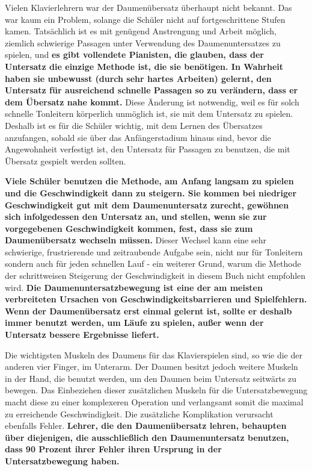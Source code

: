 Vielen Klavierlehrern war der Daumenübersatz überhaupt nicht bekannt.
Das war kaum ein Problem, solange die Schüler nicht auf fortgeschrittene Stufen kamen.
Tatsächlich ist es mit genügend Anstrengung und Arbeit möglich, ziemlich schwierige Passagen unter Verwendung des Daumenuntersatzes zu spielen, und \textbf{es gibt vollendete Pianisten, die glauben, dass der Untersatz die einzige Methode ist, die sie benötigen.
In Wahrheit haben sie unbewusst (durch sehr hartes Arbeiten) gelernt, den Untersatz für ausreichend schnelle Passagen so zu verändern, dass er  dem Übersatz nahe kommt.}
Diese Änderung ist notwendig, weil es für solch schnelle Tonleitern körperlich unmöglich ist, sie mit dem Untersatz zu spielen.
Deshalb ist es für die Schüler wichtig, mit dem Lernen des Übersatzes anzufangen, sobald sie über das Anfängerstadium hinaus sind, bevor die Angewohnheit verfestigt ist, den Untersatz für Passagen zu benutzen, die mit Übersatz gespielt werden sollten.

\textbf{Viele Schüler benutzen die Methode, am Anfang langsam zu spielen und die Geschwindigkeit dann zu steigern.
Sie kommen bei niedriger Geschwindigkeit gut mit dem Daumenuntersatz zurecht, gewöhnen sich infolgedessen den Untersatz an, und stellen, wenn sie zur vorgegebenen Geschwindigkeit kommen, fest, dass sie zum Daumenübersatz wechseln müssen.}
Dieser Wechsel kann eine sehr schwierige, frustrierende und zeitraubende Aufgabe sein, nicht nur für Tonleitern sondern auch für jeden schnellen Lauf - ein weiterer Grund, warum die Methode der schrittweisen Steigerung der Geschwindigkeit in diesem Buch nicht empfohlen wird.
\textbf{Die Daumenuntersatzbewegung ist eine der am meisten verbreiteten Ursachen von Geschwindigkeitsbarrieren und Spielfehlern.
Wenn der Daumenübersatz erst einmal gelernt ist, sollte er deshalb immer benutzt werden, um Läufe zu spielen, außer wenn der Untersatz bessere Ergebnisse liefert.}

Die wichtigsten Muskeln des Daumens für das Klavierspielen sind, so wie die der anderen vier Finger, im Unterarm.
Der Daumen besitzt jedoch weitere Muskeln in der Hand, die benutzt werden, um den Daumen beim Untersatz seitwärts zu bewegen.
Das Einbeziehen dieser zusätzlichen Muskeln für die Untersatzbewegung macht diese zu einer komplexeren Operation und verlangsamt somit die maximal zu erreichende Geschwindigkeit.
Die zusätzliche Komplikation verursacht ebenfalls Fehler.
\textbf{Lehrer, die den Daumenübersatz lehren, behaupten über diejenigen, die ausschließlich den Daumenuntersatz benutzen, dass 90 Prozent ihrer Fehler ihren Ursprung in der Untersatzbewegung haben.}

